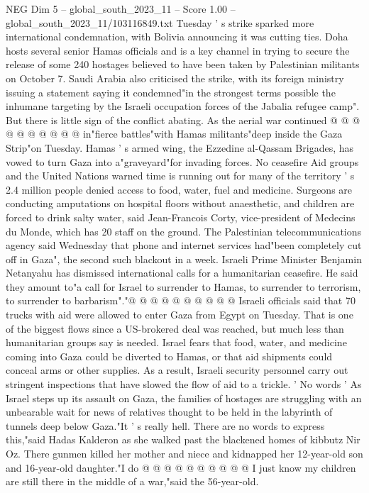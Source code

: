 \begin{textsample}{NEG Dim 5 – global\_south\_2023\_11 – Score 1.00 – global\_south\_2023\_11/103116849.txt}
Tuesday ' s strike sparked more international condemnation, with Bolivia announcing it was cutting ties.
Doha hosts several senior Hamas officials and is a key channel in trying to secure the release of some 240 hostages believed to have been taken by Palestinian militants on October 7.
Saudi Arabia also criticised the strike, with its foreign ministry issuing a statement saying it condemned"in the strongest terms possible the inhumane targeting by the Israeli occupation forces of the Jabalia refugee camp".
But there is little sign of the conflict abating.
As the aerial war continued @ @ @ @ @ @ @ @ @ @ in"fierce battles"with Hamas militants"deep inside the Gaza Strip"on Tuesday.
Hamas ' s armed wing, the Ezzedine al-Qassam Brigades, has vowed to turn Gaza into a"graveyard"for invading forces.
No ceasefire Aid groups and the United Nations warned time is running out for many of the territory ' s 2.4 million people denied access to food, water, fuel and medicine.
Surgeons are conducting amputations on hospital floors without anaesthetic, and children are forced to drink salty water, said Jean-Francois Corty, vice-president of Medecins du Monde, which has 20 staff on the ground.
The Palestinian telecommunications agency said Wednesday that phone and internet services had"been completely cut off in Gaza", the second such blackout in a week.
Israeli Prime Minister Benjamin Netanyahu has dismissed international calls for a humanitarian ceasefire.
He said they amount to"a call for Israel to surrender to Hamas, to surrender to terrorism, to surrender to barbarism"."@ @ @ @ @ @ @ @ @ @ Israeli officials said that 70 trucks with aid were allowed to enter Gaza from Egypt on Tuesday.
That is one of the biggest flows since a US-brokered deal was reached, but much less than humanitarian groups say is needed.
Israel fears that food, water, and medicine coming into Gaza could be diverted to Hamas, or that aid shipments could conceal arms or other supplies.
As a result, Israeli security personnel carry out stringent inspections that have slowed the flow of aid to a trickle. ' No words ' As Israel steps up its assault on Gaza, the families of hostages are struggling with an unbearable wait for news of relatives thought to be held in the labyrinth of tunnels deep below Gaza."It ' s really hell.
There are no words to express this,"said Hadas Kalderon as she walked past the blackened homes of kibbutz Nir Oz.
There gunmen killed her mother and niece and kidnapped her 12-year-old son and 16-year-old daughter."I do @ @ @ @ @ @ @ @ @ @ I just know my children are still there in the middle of a war,"said the 56-year-old.

\end{textsample}
